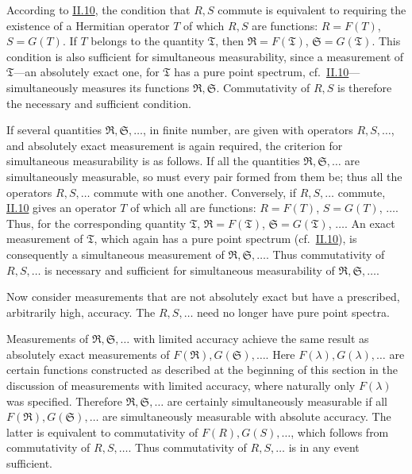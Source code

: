 \documentclass[fontsize=13pt,twoside,openany,headings=normal,parskip=false,bookmarkpackage=false,DIV=calc]{scrbook}
\begin{document}
\hypertarget{origpage-120}{}%
According to \hyperref[sec:II.10]{II.10}, the condition that $R,S$ commute is equivalent to requiring the existence of a Hermitian operator $T$ of which $R,S$ are functions: $R=F(T)$, $S=G(T)$. If $T$ belongs to the quantity $\mathfrak T$, then $\mathfrak R=F(\mathfrak T)$, $\mathfrak S=G(\mathfrak T)$. This condition is also sufficient for simultaneous measurability, since a measurement of $\mathfrak T$---an absolutely exact one, for $\mathfrak T$ has a pure point spectrum, cf.\ \hyperref[sec:II.10]{II.10}---simultaneously measures its functions $\mathfrak R,\mathfrak S$. Commutativity of $R,S$ is therefore the necessary and sufficient condition.

If several quantities $\mathfrak R,\mathfrak S,\ldots$, in finite number, are given with operators $R,S,\ldots$, and absolutely exact measurement is again required, the criterion for simultaneous measurability is as follows. If all the quantities $\mathfrak R,\mathfrak S,\ldots$ are simultaneously measurable, so must every pair formed from them be; thus all the operators $R,S,\ldots$ commute with one another. Conversely, if $R,S,\ldots$ commute, \hyperref[sec:II.10]{II.10} gives an operator $T$ of which all are functions: $R=F(T)$, $S=G(T)$, $\ldots$. Thus, for the corresponding quantity $\mathfrak T$, $\mathfrak R=F(\mathfrak T)$, $\mathfrak S=G(\mathfrak T)$, $\ldots$. An exact measurement of $\mathfrak T$, which again has a pure point spectrum (cf.\ \hyperref[sec:II.10]{II.10}), is consequently a simultaneous measurement of $\mathfrak R,\mathfrak S,\ldots$. Thus commutativity of $R,S,\ldots$ is necessary and sufficient for simultaneous measurability of $\mathfrak R,\mathfrak S,\ldots$.

Now consider measurements that are not absolutely exact but have a prescribed, arbitrarily high, accuracy. The $R,S,\ldots$ need no longer have pure point spectra.

Measurements of $\mathfrak R,\mathfrak S,\ldots$ with limited accuracy achieve the same result as absolutely exact measurements of $F(\mathfrak R),G(\mathfrak S),\ldots$. Here $F(\lambda),G(\lambda),\ldots$ are certain functions constructed as described at the beginning of this section in the discussion of measurements with limited accuracy, where naturally only $F(\lambda)$ was specified. Therefore $\mathfrak R,\mathfrak S,\ldots$ are certainly simultaneously measurable if all $F(\mathfrak R),G(\mathfrak S),\ldots$ are simultaneously measurable with absolute accuracy. The latter is equivalent to commutativity of $F(R),G(S),\ldots$, which follows from commutativity of $R,S,\ldots$. Thus commutativity of $R,S,\ldots$ is in any event sufficient.
\end{document}
